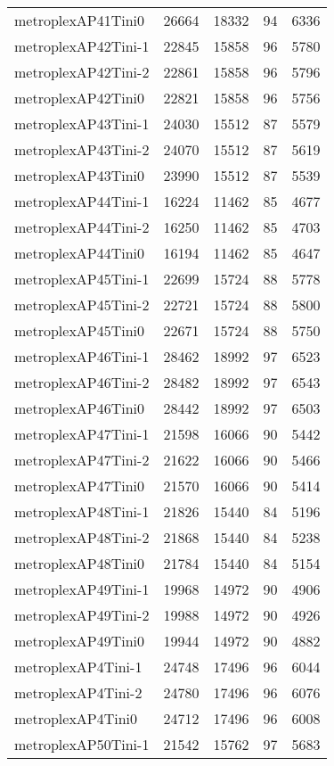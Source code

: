 \begin{longtable}{lrrrr}
metroplexAP41Tini0 & 26664 & 18332 & 94 & 6336 \\
metroplexAP42Tini-1 & 22845 & 15858 & 96 & 5780 \\
metroplexAP42Tini-2 & 22861 & 15858 & 96 & 5796 \\
metroplexAP42Tini0 & 22821 & 15858 & 96 & 5756 \\
metroplexAP43Tini-1 & 24030 & 15512 & 87 & 5579 \\
metroplexAP43Tini-2 & 24070 & 15512 & 87 & 5619 \\
metroplexAP43Tini0 & 23990 & 15512 & 87 & 5539 \\
metroplexAP44Tini-1 & 16224 & 11462 & 85 & 4677 \\
metroplexAP44Tini-2 & 16250 & 11462 & 85 & 4703 \\
metroplexAP44Tini0 & 16194 & 11462 & 85 & 4647 \\
metroplexAP45Tini-1 & 22699 & 15724 & 88 & 5778 \\
metroplexAP45Tini-2 & 22721 & 15724 & 88 & 5800 \\
metroplexAP45Tini0 & 22671 & 15724 & 88 & 5750 \\
metroplexAP46Tini-1 & 28462 & 18992 & 97 & 6523 \\
metroplexAP46Tini-2 & 28482 & 18992 & 97 & 6543 \\
metroplexAP46Tini0 & 28442 & 18992 & 97 & 6503 \\
metroplexAP47Tini-1 & 21598 & 16066 & 90 & 5442 \\
metroplexAP47Tini-2 & 21622 & 16066 & 90 & 5466 \\
metroplexAP47Tini0 & 21570 & 16066 & 90 & 5414 \\
metroplexAP48Tini-1 & 21826 & 15440 & 84 & 5196 \\
metroplexAP48Tini-2 & 21868 & 15440 & 84 & 5238 \\
metroplexAP48Tini0 & 21784 & 15440 & 84 & 5154 \\
metroplexAP49Tini-1 & 19968 & 14972 & 90 & 4906 \\
metroplexAP49Tini-2 & 19988 & 14972 & 90 & 4926 \\
metroplexAP49Tini0 & 19944 & 14972 & 90 & 4882 \\
metroplexAP4Tini-1 & 24748 & 17496 & 96 & 6044 \\
metroplexAP4Tini-2 & 24780 & 17496 & 96 & 6076 \\
metroplexAP4Tini0 & 24712 & 17496 & 96 & 6008 \\
metroplexAP50Tini-1 & 21542 & 15762 & 97 & 5683 \\

\end{longtable}
